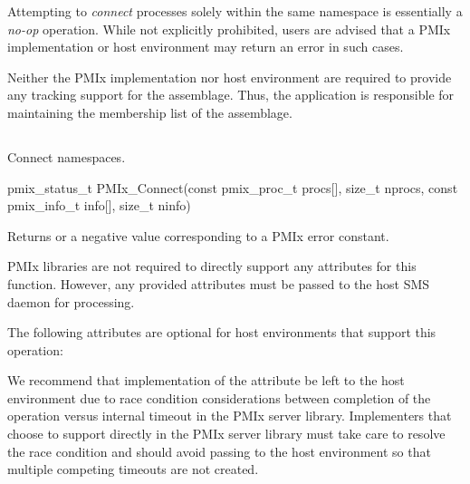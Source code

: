 \adviceuserstart
Attempting to \textit{connect} processes solely within the same namespace is essentially a \textit{no-op} operation. While not explicitly prohibited, users are advised that a \ac{PMIx} implementation or host environment may return an error in such cases.

Neither the \ac{PMIx} implementation nor host environment are required to provide any tracking support for the assemblage. Thus, the application is responsible for maintaining the membership list of the assemblage.

\adviceuserend

\subsection{}

\summary

Connect namespaces.

\format

\cspecificstart
\begin{codepar}
pmix_status_t
PMIx_Connect(const pmix_proc_t procs[], size_t nprocs,
             const pmix_info_t info[], size_t ninfo)
\end{codepar}
\cspecificend

\begin{arglist}
\end{arglist}

Returns  or a negative value corresponding to a PMIx error constant.

\reqattrstart
\ac{PMIx} libraries are not required to directly support any attributes for this function. However, any provided attributes must be passed to the host \ac{SMS} daemon for processing.

\reqattrend

\optattrstart
The following attributes are optional for host environments that support this operation:


\optattrend

\adviceimplstart
We recommend that implementation of the  attribute be left to the host environment due to race condition considerations between completion of the operation versus internal timeout in the \ac{PMIx} server library. Implementers that choose to support  directly in the \ac{PMIx} server library must take care to resolve the race condition and should avoid passing  to the host environment so that multiple competing timeouts are not created.
\adviceimplend


